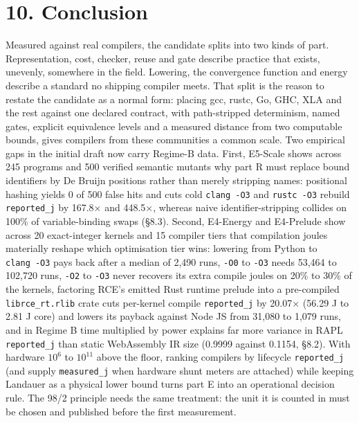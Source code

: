 \documentclass[10pt,letterpaper]{article}
\begin{document}
\section{10. Conclusion}\label{conclusion}

Measured against real compilers, the candidate splits into two kinds of
part. Representation, cost, checker, reuse and gate describe practice
that exists, unevenly, somewhere in the field. Lowering, the convergence
function and energy describe a standard no shipping compiler meets. That
split is the reason to restate the candidate as a normal form: placing
gcc, rustc, Go, GHC, XLA and the rest against one declared contract,
with path-stripped determinism, named gates, explicit equivalence levels
and a measured distance from two computable bounds, gives compilers from
these communities a common scale. Two empirical gaps in the initial
draft now carry Regime-B data. First, E5-Scale shows across 245 programs
and 500 verified semantic mutants why part R must replace bound
identifiers by De Bruijn positions rather than merely stripping names:
positional hashing yields 0 of 500 false hits and cuts cold
\texttt{clang\ -\allowbreak{}O3} and \texttt{rustc\ -\allowbreak{}O3} rebuild \texttt{reported\_\allowbreak{}j}
by 167.8× and 448.5×, whereas naive identifier-stripping collides on
100\% of variable-binding swaps (§8.3). Second, E4-Energy and E4-Prelude
show across 20 exact-integer kernels and 15 compiler tiers that
compilation joules materially reshape which optimisation tier wins:
lowering from Python to \texttt{clang\ -\allowbreak{}O3} pays back after a median of
2,490 runs, \texttt{-O0} to \texttt{-O3} needs 53,464 to 102,720 runs,
\texttt{-O2} to \texttt{-O3} never recovers its extra compile joules on
20\% to 30\% of the kernels, factoring RCE's emitted Rust runtime
prelude into a pre-compiled \texttt{librce\_\allowbreak{}rt.\allowbreak{}rlib} crate cuts
per-kernel compile \texttt{reported\_\allowbreak{}j} by 20.07× (56.29 J to 2.81 J
core) and lowers its payback against Node JS from 31,080 to 1,079 runs,
and in Regime B time multiplied by power explains far more variance in
RAPL \texttt{reported\_\allowbreak{}j} than static WebAssembly IR size (0.9999
against 0.1154, §8.2). With hardware \(10^6\) to \(10^{11}\) above the
floor, ranking compilers by lifecycle \texttt{reported\_\allowbreak{}j} (and supply
\texttt{measured\_\allowbreak{}j} when hardware shunt meters are attached) while
keeping Landauer as a physical lower bound turns part E into an
operational decision rule. The 98/2 principle needs the same treatment:
the unit it is counted in must be chosen and published before the first
measurement.
\end{document}
